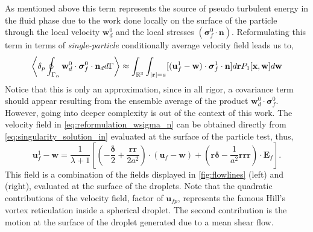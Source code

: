 As mentioned above this term represents the source of pseudo turbulent energy in the fluid phase due to the work done locally on the surface of the particle through the local velocity $\textbf{w}_d^0$ and the local stresses $(\bm\sigma_f^0 \cdot \textbf{n})$.
Reformulating this term in terms of \textit{single-particle} conditionally average velocity field leads us to, 
\begin{equation}
    \pavg{ \intS{\textbf{w}_d^0 \cdot \bm{\sigma}_f^0 \cdot \textbf{n}_d}}
    \approx
    \int_{\mathbb{R}^3} \int_{|\textbf{r}| = a}
    [(\textbf{u}^1_f - \textbf{w})\cdot \bm\sigma_f^1\cdot \textbf{n} ]
    d\textbf{r}
    P_1[\textbf{x},\textbf{w}]
    d\textbf{w} 
    \label{eq:reformulation_wsigma_n}
\end{equation} 
Notice that this is only an approximation, since in all rigor, a covariance term should appear resulting from the ensemble average of the product $\textbf{w}_d^0 \cdot \bm{\sigma}_f^0$. 
However, going into deeper complexity is out of the context of this work.  
The velocity field in \ref{eq:reformulation_wsigma_n} can be obtained directly from \ref{eq:singularity_solution_in}  evaluated at the surface of the particle test, thus,
\begin{equation*}
    \textbf{u}^1_f - \textbf{w}
    = 
    \frac{1}{\lambda +1} \left[\left(
        -\frac{\bm\delta}{2}
        + 
        \frac{\textbf{rr}}{2a^2}
    \right)\cdot (\textbf{u}_{f} - \textbf{w}) 
    + \left(\textbf{r}\bm\delta
    -\frac{1}{a^2}\textbf{rrr}\right)\cdot \textbf{E}_f
    \right].
\end{equation*}
This field is a combination of the fields displayed in \ref{fig:flowlines} (left) and (right), evaluated at the surface of the droplets. 
Note that the quadratic contributions of the velocity field, factor of $\textbf{u}_{fp}$, represents the famous Hill's vortex reticulation inside a spherical droplet. 
The second contribution is the motion at the surface of the droplet generated due to a mean shear flow. 

